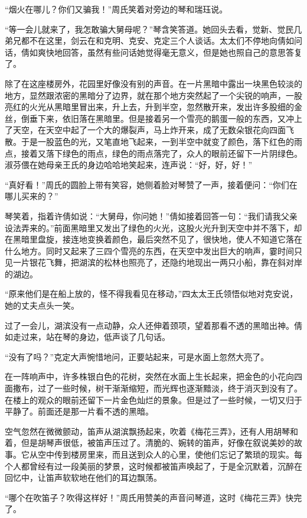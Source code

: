 \par “烟火在哪儿？你们又骗我！”周氏笑着对旁边的琴和瑞珏说。
\par “等一会儿就来了，我怎敢骗大舅母呢？”琴含笑答道。她回头去看，觉新、觉民几弟兄都不在这里，剑云在和克明、克安、克定三个人谈话。太太们不停地向倩如问话，倩如爽快地回答，虽然有些问话她觉得毫无意义，但是她也照自己的意思答复了。
\par 除了在这座楼房外，花园里好像没有别的声音。在一片黑暗中露出一块黑色较淡的地方，显然跟浓密的黑暗分了边界，就在那个地方突然起了一个尖锐的响声，一股亮红的火光从黑暗里冒出来，升上去，升到半空，忽然散开来，发出许多股细的金丝，倒垂下来，依旧落在黑暗里。但是接着另一个雪亮的鹅蛋一般的东西，又冲上了天空，在天空中起了一个大的爆裂声，马上炸开来，成了无数朵银花向四面飞散。于是一股蓝色的光，又笔直地飞起来，一到半空中就变了颜色，落下红色的雨点，接着又落下绿色的雨点，绿色的雨点落完了，众人的眼前还留下一片阴绿色。淑芬偎在她母亲王氏的身边哈哈地笑起来，连声说：“好，好，好！”
\par “真好看！”周氏的圆脸上带有笑容，她侧着脸对琴赞了一声，接着便问：“你们在哪儿买来的？”
\par 琴笑着，指着许倩如说：“大舅母，你问她！”倩如接着回答一句：“我们请我父亲设法弄来的。”前面黑暗里又发出了绿色的火光，这股火光升到天空中并不落下，却在黑暗里盘旋，接连地变换着颜色，最后突然不见了，很快地，使人不知道它落在什么地方。同时又起来了三四个雪亮的东西，在天空中发出巨大的响声，霎时间只见一片银花飞舞，把湖滨的松林也照亮了，还隐约地现出一两只小船，靠在斜对岸的湖边。
\par “原来他们是在船上放的，怪不得我看见在移动，”四太太王氏领悟似地对克安说，她的丈夫点头一笑。
\par 过了一会儿，湖滨没有一点动静，众人还伸着颈项，望着那看不透的黑暗出神。倩如走过来，站在琴的身边，低声谈了几句话。
\par “没有了吗？”克定大声惋惜地问，正要站起来，可是水面上忽然大亮了。
\par 在一阵响声中，许多株银白色的花树，突然在水面上生长起来，把金色的小花向四面撒布，过了一些时候，树干渐渐缩短，而光辉也逐渐黯淡，终于消灭到没有了。在楼上的观众的眼前还留下一片金色灿烂的景象。但是过了一些时候，一切又归于平静了。前面还是那一片看不透的黑暗。
\par 空气忽然在微微颤动，笛声从湖滨飘扬起来，吹着《梅花三弄》，还有人用胡琴和着，但是胡琴声很低，被笛声压过了。清脆的、婉转的笛声，好像在叙说美妙的故事。它从空中传到楼房里来，而且送到众人的心里，使他们忘记了繁琐的现实。每个人都曾经有过一段美丽的梦景，这时候都被笛声唤起了，于是全沉默着，沉醉在回忆中，让笛声软软地在他们的耳边飘荡。
\par “哪个在吹笛子？吹得这样好！”周氏用赞美的声音问琴道，这时《梅花三弄》快完了。
